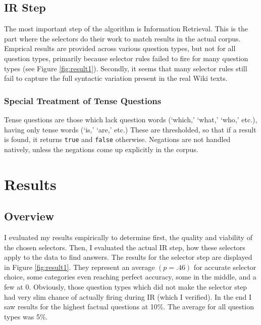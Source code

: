 \documentclass[twoside]{article}
\begin{document}
\subsection{IR Step}

The most important step of the algorithm is Information Retrieval.  This is the part where the selectors do their work to match results in the actual corpus.  Emprical results are provided across various question types, but not for all question types, primarily because selector rules failed to fire for many question types (see Figure \ref{fig:result1}).  Secondly, it seems that many selector rules still fail to capture the full syntactic variation present in the real Wiki texts.

\subsubsection{Special Treatment of Tense Questions}

Tense questions are those which lack question words (`which,' `what,' `who,' etc.), having only tense words (`is,' `are,' etc.)  These are thresholded, so that if a result is found, it returns \texttt{true} and \texttt{false} otherwise.  Negations are not handled natively, unless the negations come up explicitly in the corpus.


\section{Results}

\subsection{Overview}

I evaluated my results empirically to determine first, the quality and viability of the chosen selectors.  Then, I evaluated the actual IR step, how these selectors apply to the data to find answers.  The results for the selector step are displayed in Figure \ref{fig:result1}.  They represent an average $(p=.46)$ for accurate selector choice, some categories even reaching perfect accuracy, some in the middle, and a few at 0.  Obviously, those question types which did not make the selector step had very slim chance of actually firing during IR (which I verified).  In the end I saw results for the highest factual questions at 10\%.  The average for all question types was 5\%.
\end{document}
